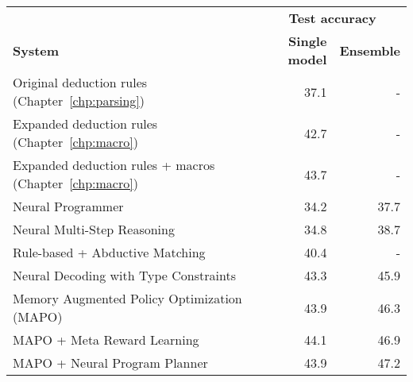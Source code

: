 \begin{tabular}{lrr} \toprule
& \multicolumn{2}{c}{\textbf{Test accuracy}} \\
\cmidrule{2-3}
\textbf{System}
& \textbf{Single model}
& \textbf{Ensemble} \\ \midrule
Original deduction rules (Chapter~\ref{chp:parsing})
& 37.1
& - \\
Expanded deduction rules (Chapter~\ref{chp:macro})
& 42.7
& - \\
Expanded deduction rules + macros (Chapter~\ref{chp:macro})
& 43.7
& - \\ 
\midrule

Neural Programmer \cite{neelakantan2017learning}
& 34.2
& 37.7 \\
Neural Multi-Step Reasoning \cite{haug2018neural}
& 34.8
& 38.7 \\
Rule-based + Abductive Matching \cite{dhamdhere2017abductive}
& 40.4
& - \\
Neural Decoding with Type Constraints \cite{krishnamurthy2017neural}
& 43.3
& 45.9 \\
Memory Augmented Policy Optimization (MAPO) \cite{liang2018mapo}
& 43.9
& 46.3 \\
MAPO + Meta Reward Learning \cite{agarwal2019learning}
& 44.1
& 46.9 \\
MAPO + Neural Program Planner \cite{biloki2019neural}
& 43.9
& 47.2 \\
\bottomrule

\end{tabular}
